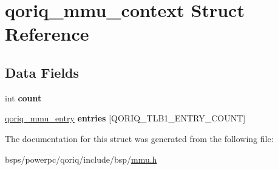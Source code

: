 \hypertarget{structqoriq__mmu__context}{}\section{qoriq\+\_\+mmu\+\_\+context Struct Reference}
\label{structqoriq__mmu__context}
\subsection*{Data Fields}
\begin{DoxyCompactItemize}
\item 
\mbox{\label{structqoriq__mmu__context_aae3a1a3744af0ba39f28bd85651c5f35}} 
int {\bfseries count}
\item 
\mbox{\label{structqoriq__mmu__context_a81926c51758dadd73b303ccd1d91a54e}} 
\mbox{\hyperlink{structqoriq__mmu__entry}{qoriq\+\_\+mmu\+\_\+entry}} {\bfseries entries} \mbox{[}Q\+O\+R\+I\+Q\+\_\+\+T\+L\+B1\+\_\+\+E\+N\+T\+R\+Y\+\_\+\+C\+O\+U\+NT\mbox{]}
\end{DoxyCompactItemize}


The documentation for this struct was generated from the following file\+:\begin{DoxyCompactItemize}
\item 
bsps/powerpc/qoriq/include/bsp/\mbox{\hyperlink{powerpc_2qoriq_2include_2bsp_2mmu_8h}{mmu.\+h}}\end{DoxyCompactItemize}

